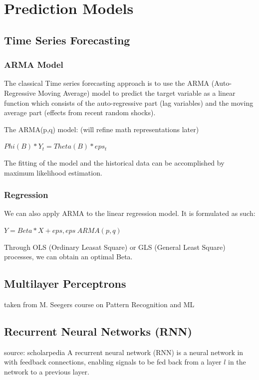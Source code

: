 \section*{Prediction Models}

\subsection*{Time Series Forecasting}

\subsubsection*{ARMA Model}
The classical Time series forecasting approach is to use the ARMA (Auto-Regressive
Moving Average) model to predict the target variable as a linear function which
consists of the auto-regressive part (lag variables) and the moving average part
(effects from recent random shocks).

The ARMA(p,q) model: (will refine math representations later)

$Phi(B) * Y_t = Theta(B) * eps_t$

The fitting of the model and the historical
data can be accomplished by maximum likelihood estimation.

\subsubsection*{Regression}
We can also apply ARMA to the linear regression model. It is formulated as such:

$Y = Beta*X + eps,   eps ~ ARMA(p,q)$

Through OLS (Ordinary Leasat Square) or GLS (General Least Square) processes,
we can obtain an optimal Beta.

\subsection*{Multilayer Perceptrons}
taken from M. Seegers course on Pattern Recognition and ML

\subsection*{Recurrent Neural Networks (RNN)}
source: scholarpedia
A recurrent neural network (RNN) is a neural network in with feedback connections, enabling signals to be fed back from a layer $l$ in the network to a previous layer. %


